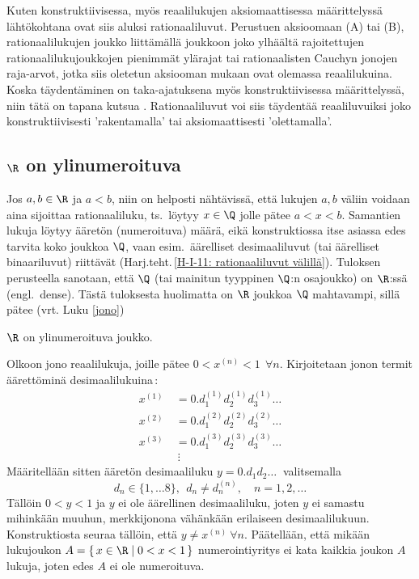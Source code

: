 Kuten konstruktiivisessa, myös reaalilukujen aksiomaattisessa määrittelyssä lähtökohtana ovat 
siis aluksi rationaaliluvut. Perustuen aksioomaan (A) tai (B), rationaalilukujen joukko 
 liittämällä joukkoon joko ylhäältä rajoitettujen rationaalilukujoukkojen 
pienimmät ylärajat tai rationaalisten Cauchyn jonojen raja-arvot, jotka siis oletetun aksiooman
mukaan ovat olemassa reaalilukuina. Koska täydentäminen on taka-ajatuksena myös
%
konstruktiivisessa määrittelyssä, niin tätä on tapana kutsua .
Rationaaliluvut voi siis täydentää reaaliluvuiksi joko konstruktiivisesti 'rakentamalla' tai
aksiomaattisesti 'olettamalla'.

\subsection*{$\R$ on ylinumeroituva}
%

Jos $a,b \in \R$ ja $a<b$, niin on helposti nähtävissä, että lukujen $a,b$ väliin voidaan aina
sijoittaa rationaaliluku, ts.\ löytyy $x \in \Q$ jolle pätee $a<x<b$. Samantien lukuja löytyy
ääretön (numeroituva) määrä, eikä konstruktiossa itse asiassa edes tarvita koko joukkoa $\Q$,
vaan esim.\ äärelliset desimaaliluvut (tai äärelliset binaariluvut) riittävät
(Harj.teht.\,\ref{H-I-11: rationaaliluvut välillä}). Tuloksen perusteella sanotaan, että $\Q$
%
(tai mainitun tyyppinen $\Q$:n osajoukko) on $\R$:ssä  (engl.\ dense). Tästä 
tuloksesta huolimatta on $\R$ joukkoa $\Q$ mahtavampi, sillä pätee (vrt. Luku \ref{jono})
\begin{Lause} \label{R on ylinumeroituva} $\R$ on ylinumeroituva joukko. 
\end{Lause}
\tod Olkoon  jono reaalilukuja, joille pätee $0 < x^{(n)} < 1\ \ \forall n$. 
Kirjoitetaan jonon termit äärettöminä desimaalilukuina\,:
\begin{align*}
x^{(1)}\ &= 0.d_1^{(1)}d_2^{(1)}d_3^{(1)} \ldots \\
x^{(2)}\ &= 0.d_1^{(2)}d_2^{(2)}d_3^{(2)} \ldots \\
x^{(3)}\ &= 0.d_1^{(3)}d_2^{(3)}d_3^{(3)} \ldots \\
          &\ \vdots
\end{align*}
Määritellään sitten ääretön desimaaliluku $y = 0.d_1d_2 \ldots\ $ valitsemalla 
\[
d_n \in \{1,\ldots 8\},\ \ d_n \neq d_n^{(n)}, \quad n = 1,2, \ldots
\] 
Tällöin $0<y<1$ ja $y$ ei ole äärellinen desimaaliluku, joten $y$ ei samastu mihinkään muuhun,
merkkijonona vähänkään erilaiseen desimaalilukuun. Konstruktiosta seuraa tällöin, että 
$y \neq x^{(n)}\ \forall n$. Päätellään, että mikään lukujoukon 
$A = \{\,x \in \R \mid 0<x<1\,\}$ numerointiyritys ei kata kaikkia joukon $A$ lukuja, joten 
edes $A$ ei ole numeroituva. \loppu

